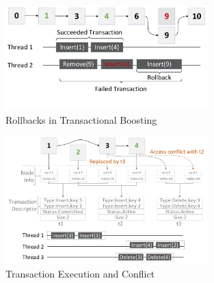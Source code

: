 \documentclass[]{sig-alternate-05-2015}
\begin{document}
\begin{figure}[p]
    \centering
    \includegraphics[width=0.7\textwidth]{figure/boosting.pdf}
    \caption{Rollbacks in Transactional Boosting}
    \label{fig:boosting}
\end{figure}

\begin{figure}[p]
    \centering
    \includegraphics[width=0.7\textwidth]{figure/lfttconflict.pdf}
    \caption{Transaction Execution and Conflict}
    \label{fig:lfttconflict}
\end{figure}
\end{document}
